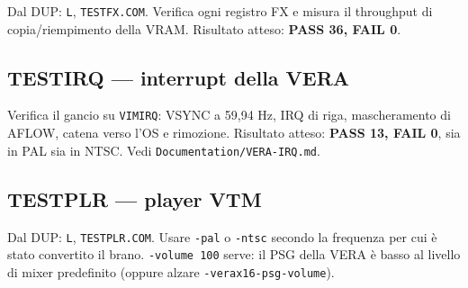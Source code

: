 \documentclass[
]{article}
\newenvironment{Shaded}{}{}
\newcommand{\AttributeTok}[1]{\textcolor[rgb]{0.49,0.56,0.16}{#1}}
\newcommand{\DataTypeTok}[1]{\textcolor[rgb]{0.56,0.13,0.00}{#1}}
\newcommand{\NormalTok}[1]{#1}
\newcommand{\VariableTok}[1]{\textcolor[rgb]{0.10,0.09,0.49}{#1}}
\begin{document}
Dal DUP: \texttt{L}, \texttt{TESTFX.COM}. Verifica ogni registro FX e
misura il throughput di copia/riempimento della VRAM. Risultato atteso:
\textbf{PASS 36, FAIL 0}.

\subsection{TESTIRQ --- interrupt della
VERA}\label{testirq-interrupt-della-vera}

\begin{Shaded}
\end{Shaded}

Verifica il gancio su \texttt{VIMIRQ}: VSYNC a 59,94 Hz, IRQ di riga,
mascheramento di AFLOW, catena verso l'OS e rimozione. Risultato atteso:
\textbf{PASS 13, FAIL 0}, sia in PAL sia in NTSC. Vedi
\texttt{Documentation/VERA-IRQ.md}.

\subsection{TESTPLR --- player VTM}\label{testplr-player-vtm}

\begin{Shaded}
\end{Shaded}

Dal DUP: \texttt{L}, \texttt{TESTPLR.COM}. Usare \texttt{-pal} o
\texttt{-ntsc} secondo la frequenza per cui è stato convertito il brano.
\texttt{-volume\ 100} serve: il PSG della VERA è basso al livello di
mixer predefinito (oppure alzare \texttt{-verax16-psg-volume}).
\end{document}
